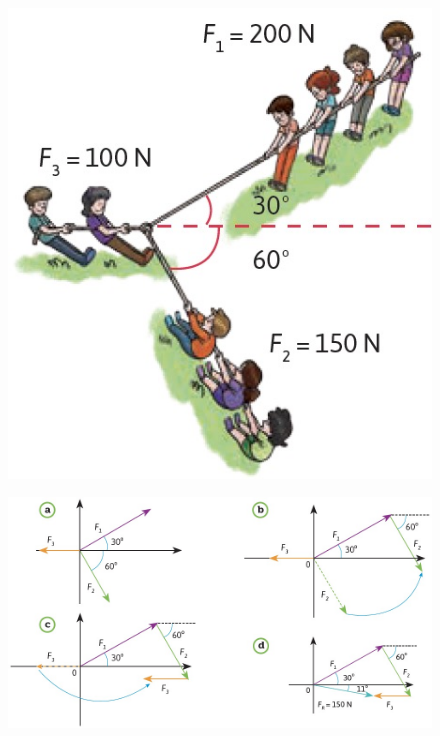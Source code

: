 \documentclass[11pt]{book}
\begin{document}
\begin{minipage}[t]{0.33\textwidth}
    \begin{figure}[H]
        \centering
        \includegraphics[width=\linewidth]{suma_ninios01.jpg}
        \label{fig:suma_ninios01}
    \end{figure}
\end{minipage}\hfill
\begin{minipage}[t]{0.65\textwidth}
    \begin{figure}[H]
        \centering
        \includegraphics[width=\linewidth]{suma_ninios02.jpg}
        \label{fig:suma_ninios02}
    \end{figure}
\end{minipage}\\
\end{document}
